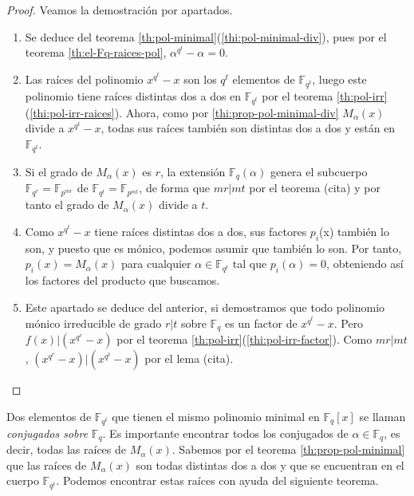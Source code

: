 \begin{proof}
  Veamos la demostración por apartados.
  \begin{enumerate}
    \item Se deduce del teorema \ref{th:pol-minimal}(\ref{thi:pol-minimal-div}), pues por el teorema \ref{th:el-Fq-raices-pol}, \(\alpha^{q^t} - \alpha = 0\).
    \item Las raíces del polinomio \(x^{q^t} - x\) son los \(q^t\) elementos de \(\mathbb F_{q^t}\), luego este polinomio tiene raíces distintas dos a dos en \(\mathbb F_{q^t}\) por el teorema \ref{th:pol-irr}(\ref{thi:pol-irr-raices}).
    Ahora, como por \ref{thi:prop-pol-minimal-div} \(M_{\alpha}(x)\) divide a \(x^{q^t} - x\), todas sus raíces también son distintas dos a dos y están en \(\mathbb F_{q^t}\).
    \item Si el grado de \(M_{\alpha}(x)\) es \(r\), la extensión \(\mathbb F_{q}(\alpha)\) genera el subcuerpo \(\mathbb F_{q^r} = \mathbb F_{p^{mr}}\) de \(\mathbb F_{q^t} = \mathbb F_{p^{mt}}\), de forma que \(mr | mt\) por el teorema (cita) y por tanto el grado de \(M_{\alpha}(x)\) divide a \(t\). %
    \item Como \(x^{q^t} - x\) tiene raíces distintas dos a dos, sus factores \(p_i\)(x) también lo son, y puesto que es mónico, podemos asumir que también lo son.
    Por tanto, \(p_{i}(x) = M_{\alpha}(x)\) para cualquier \(\alpha \in \mathbb F_{q^t}\) tal que \(p_i(\alpha) = 0\), obteniendo así los factores del producto que buscamos.
    \item Este apartado se deduce del anterior, si demostramos que todo polinomio mónico irreducible de grado \(r | t\) sobre \(\mathbb F_q\) es un factor de \(x^{q^t} - x\).
    Pero \(f(x) | (x^{q^r} - x)\) por el teorema \ref{th:pol-irr}(\ref{thi:pol-irr-factor}).
    Como \(mr | mt\), \((x^{q^r} - x) | (x^{q^t} - x)\) por el lema (cita).\qedhere
  \end{enumerate}
\end{proof}

Dos elementos de \(\mathbb F_{q^t}\) que tienen el mismo polinomio minimal en \(\mathbb F_q[x]\) se llaman \textit{conjugados sobre} \(\mathbb F_q\).
Es importante encontrar todos los conjugados de \(\alpha \in \mathbb F_q\), es decir, todas las raíces de \(M_{\alpha}(x)\).
Sabemos por el teorema \ref{th:prop-pol-minimal} que las raíces de \(M_{\alpha}(x)\) son todas distintas dos a dos y que se encuentran en el cuerpo \(\mathbb F_{q^t}\).
Podemos encontrar estas raíces con ayuda del siguiente teorema.

